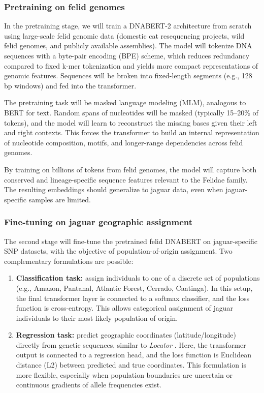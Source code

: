 \subsubsection{Pretraining on felid genomes}

In the pretraining stage, we will train a DNABERT-2 architecture \cite{zhou2024dnabert} from scratch using large-scale felid genomic data (domestic cat resequencing projects, wild felid genomes, and publicly available assemblies). The model will tokenize DNA sequences with a byte-pair encoding (BPE) scheme, which reduces redundancy compared to fixed k-mer tokenization and yields more compact representations of genomic features. Sequences will be broken into fixed-length segments (e.g., 128 bp windows) and fed into the transformer.

The pretraining task will be masked language modeling (MLM), analogous to BERT for text. Random spans of nucleotides will be masked (typically 15–20\% of tokens), and the model will learn to reconstruct the missing bases given their left and right contexts. This forces the transformer to build an internal representation of nucleotide composition, motifs, and longer-range dependencies across felid genomes.

By training on billions of tokens from felid genomes, the model will capture both conserved and lineage-specific sequence features relevant to the Felidae family. The resulting embeddings should generalize to jaguar data, even when jaguar-specific samples are limited.

\subsubsection{Fine-tuning on jaguar geographic assignment}

The second stage will fine-tune the pretrained felid DNABERT on jaguar-specific SNP datasets, with the objective of population-of-origin assignment. Two complementary formulations are possible:

\begin{enumerate}
	\item \textbf{Classification task:} assign individuals to one of a discrete set of populations (e.g., Amazon, Pantanal, Atlantic Forest, Cerrado, Caatinga). In this setup, the final transformer layer is connected to a softmax classifier, and the loss function is cross-entropy. This allows categorical assignment of jaguar individuals to their most likely population of origin.
	\item \textbf{Regression task:} predict geographic coordinates (latitude/longitude) directly from genetic sequences, similar to \textit{Locator} \cite{battey2020predicting}. Here, the transformer output is connected to a regression head, and the loss function is Euclidean distance (L2) between predicted and true coordinates. This formulation is more flexible, especially when population boundaries are uncertain or continuous gradients of allele frequencies exist.
\end{enumerate}

